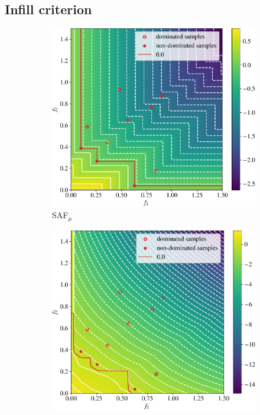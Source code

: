 \documentclass[conference]{IEEEtran}
\newcommand\safmu{SAF$_{\mu}$\xspace}
\begin{document}
\subsection{Infill criterion}\label{section: infill_criterion}

\begin{figure}[t]
\begin{subfigure}[t]{0.48\columnwidth}
    \includegraphics[width=\columnwidth]{figures/_objective_space_SAF_mu.pdf}
    \caption{\safmu}
    \label{fig: saf_obj_space}
\end{subfigure}
\begin{subfigure}[t]{0.48\columnwidth}
    \includegraphics[width=\columnwidth]{figures/_objective_space_SMSEGO.pdf}

\end{subfigure}
\end{figure}
\end{document}
